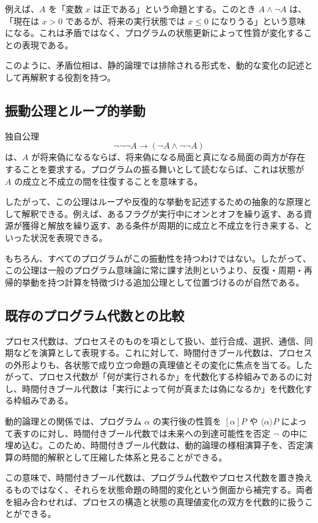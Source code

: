 \documentclass[10pt]{ltjsarticle}
\begin{document}
例えば、$A$ を「変数 $x$ は正である」という命題とする。このとき $A \land \neg A$ は、「現在は $x>0$ であるが、将来の実行状態では $x \leq 0$ になりうる」という意味になる。これは矛盾ではなく、プログラムの状態更新によって性質が変化することの表現である。

このように、矛盾位相は、静的論理では排除される形式を、動的な変化の記述として再解釈する役割を持つ。

\subsection{振動公理とループ的挙動}

独自公理
\[
  \neg\neg\neg A \to (\neg A \land \neg\neg A)
\]
は、$A$ が将来偽になるならば、将来偽になる局面と真になる局面の両方が存在することを要求する。プログラムの振る舞いとして読むならば、これは状態が $A$ の成立と不成立の間を往復することを意味する。

したがって、この公理はループや反復的な挙動を記述するための抽象的な原理として解釈できる。例えば、あるフラグが実行中にオンとオフを繰り返す、ある資源が獲得と解放を繰り返す、ある条件が周期的に成立と不成立を行き来する、といった状況を表現できる。

もちろん、すべてのプログラムがこの振動性を持つわけではない。したがって、この公理は一般のプログラム意味論に常に課す法則というより、反復・周期・再帰的挙動を持つ計算を特徴づける追加公理として位置づけるのが自然である。

\subsection{既存のプログラム代数との比較}

プロセス代数は、プロセスそのものを項として扱い、並行合成、選択、通信、同期などを演算として表現する。これに対して、時間付きブール代数は、プロセスの外形よりも、各状態で成り立つ命題の真理値とその変化に焦点を当てる。したがって、プロセス代数が「何が実行されるか」を代数化する枠組みであるのに対し、時間付きブール代数は「実行によって何が真または偽になるか」を代数化する枠組みである。

動的論理との関係では、プログラム $\alpha$ の実行後の性質を $[\alpha]P$ や $\langle\alpha\rangle P$ によって表すのに対し、時間付きブール代数では未来への到達可能性を否定 $\neg$ の中に埋め込む。このため、時間付きブール代数は、動的論理の様相演算子を、否定演算の時間的解釈として圧縮した体系と見ることができる。

この意味で、時間付きブール代数は、プログラム代数やプロセス代数を置き換えるものではなく、それらを状態命題の時間的変化という側面から補完する。両者を組み合わせれば、プロセスの構造と状態の真理値変化の双方を代数的に扱うことができる。
\end{document}

